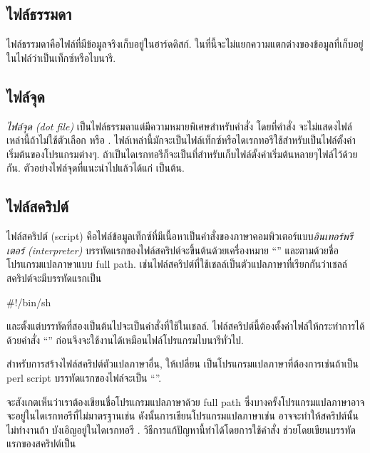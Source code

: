 \begin{thwbr}
\section{ไฟล์ธรรมดา}
ไฟล์ธรรมดาคือไฟล์ที่มีข้อมูลจริงเก็บอยู่ในฮาร์ดดิสก์. ในที่นี้จะไม่แยกความแตกต่างของข้อมูลที่เก็บอยู่ในไฟล์ว่าเป็นเท็กซ์หรือไบนารี.

\subsection{ไฟล์จุด}
\emph{ไฟล์จุด (dot file)} เป็นไฟล์ธรรมดาแต่มีความหมายพิเศษสำหรับคำสั่ง  โดยที่คำสั่ง  จะไม่แสดงไฟล์เหล่านี้ถ้าไม่ใช้ตัวเลือก  หรือ . ไฟล์เหล่านี้มักจะเป็นไฟล์เท็กซ์หรือไดเรกทอรีใช้สำหรับเป็นไฟล์ตั้งค่าเริ่มต้นของโปรแกรมต่างๆ. ถ้าเป็นไดเรกทอรีก็จะเป็นที่สำหรับเก็บไฟล์ตั้งค่าเริ่มต้นหลายๆไฟล์ไว้ด้วยกัน. ตัวอย่างไฟล์จุดที่แนะนำไปแล้วได้แก่  เป็นต้น. 

\subsection{ไฟล์สคริปต์}
ไฟล์สคริปต์ (script) คือไฟล์ข้อมูลเท็กซ์ที่มีเนื้อหาเป็นคำสั่งของภาษาคอมพิวเตอร์แบบ\emph{อินเทอร์พรีเตอร์ (interpreter)}%
%
บรรทัดแรกของไฟล์สคริปต์จะขึ้นต้นด้วยเครื่องหมาย ``\cmd{\#!}'' และตามด้วยชื่อโปรแกรมแปลภาษาแบบ full path. เช่นไฟล์สคริปต์ที่ใช้เชลล์เป็นตัวแปลภาษาที่เรียกกันว่าเชลล์สคริปต์จะมีบรรทัดแรกเป็น 
\begin{MyVerbatim}
#!/bin/sh
\end{MyVerbatim}
และตั้งแต่บรรทัดที่สองเป็นต้นไปจะเป็นคำสั่งที่ใช้ในเชลล์. ไฟล์สคริปต์นี้ต้องตั้งค่าไฟล์ให้กระทำการได้ด้วยคำสั่ง ``'' ก่อนจึงจะใช้งานได้เหมือนไฟล์โปรแกรมไบนารีทั่วไป.

สำหรับการสร้างไฟล์สคริปต์ตัวแปลภาษาอื่น, ให้เปลี่ยน  เป็นโปรแกรมแปลภาษาที่ต้องการเช่นถ้าเป็น perl script บรรทัดแรกของไฟล์จะเป็น ``''.

จะสังเกตเห็นว่าเราต้องเขียนชื่อโปรแกรมแปลภาษาด้วย full path ซึ่งบางครั้งโปรแกรมแปลภาษาอาจจะอยู่ในไดเรกทอรีที่ไม่มาตรฐานเช่น  ดังนั้นการเขียนโปรแกรมแปลภาษาเช่น  อาจจะทำให้สคริปต์นั้นไม่ทำงานถ้า  บังเอิญอยู่ในไดเรกทอรี . วิธีการแก้ปัญหานี้ทำได้โดยการใช้คำสั่ง  ช่วยโดยเขียนบรรทัดแรกของสคริปต์เป็น


\end{thwbr}
